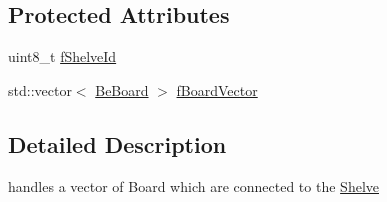 \subsection*{Protected Attributes}
\begin{DoxyCompactItemize}
\item 
uint8\-\_\-t \hyperlink{class_ph2___hw_description_1_1_shelve_ad6a771be1946db28ff6418ac419ef543}{f\-Shelve\-Id}
\item 
std\-::vector$<$ \hyperlink{class_ph2___hw_description_1_1_be_board}{Be\-Board} $>$ \hyperlink{class_ph2___hw_description_1_1_shelve_a5b87ee50bb6046acadaeb8226395da52}{f\-Board\-Vector}
\end{DoxyCompactItemize}


\subsection{Detailed Description}
handles a vector of Board which are connected to the \hyperlink{class_ph2___hw_description_1_1_shelve}{Shelve} 


